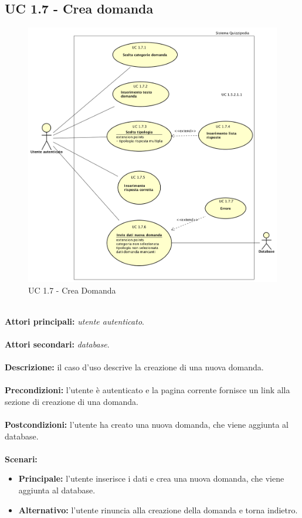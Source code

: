 \documentclass[a4paper,11pt]{article}
\begin{document}
\subsection{UC 1.7 - Crea domanda}

\begin{figure}[h!]
\centering
\includegraphics[scale=0.4]{../immagini/UC1_7.png}
\caption{UC 1.7 - Crea Domanda}
\end{figure}
\ \\
\textbf{Attori principali:} \textit{utente autenticato}.\\
\\
\textbf{Attori secondari:} \textit{database}.\\
\\
\textbf{Descrizione:} il caso d'uso descrive la creazione di una nuova domanda. \\
\\
\textbf{Precondizioni:} l'utente è autenticato e la pagina corrente fornisce un link alla sezione di creazione di una domanda.\\
\\
\textbf{Postcondizioni:} l'utente ha creato una nuova domanda, che viene aggiunta al database. \\
\\
\textbf{Scenari:}
\begin{itemize}
\item \textbf{Principale:} l'utente inserisce i dati e crea una nuova domanda, che viene aggiunta al database.
\item \textbf{Alternativo:} l'utente rinuncia alla creazione della domanda e torna indietro.\\ 
\end{itemize}
\vspace{6 mm}
\end{document}
